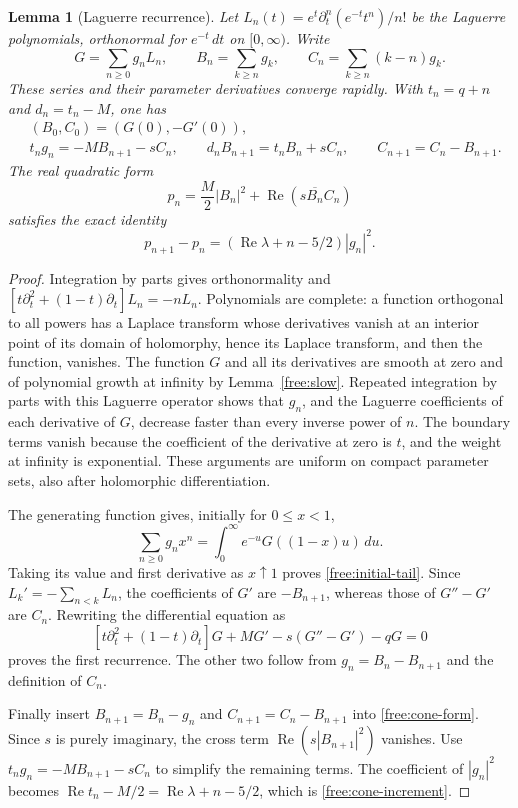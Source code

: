 \documentclass[11pt]{article}
\numberwithin{equation}{section}
\newtheorem{lemma}[theorem]{Lemma}
\theoremstyle{definition}
\theoremstyle{remark}
\begin{document}
\begin{lemma}[Laguerre recurrence]\label{free:laguerre}
Let $L_n(t)=e^t\partial_t^n(e^{-t}t^n)/n!$ be the Laguerre polynomials,
orthonormal for $e^{-t}\,dt$ on $[0,\infty)$.  Write
\[
 G=\sum_{n\ge0}g_nL_n,\qquad
 B_n=\sum_{k\ge n}g_k,\qquad C_n=\sum_{k\ge n}(k-n)g_k.
\]
These series and their parameter derivatives converge rapidly.  With
$t_n=q+n$ and $d_n=t_n-M$, one has
\begin{align}
 &(B_0,C_0)=(G(0),-G'(0)),\label{free:initial-tail}\\
 &t_ng_n=-MB_{n+1}-sC_n,\qquad
 d_nB_{n+1}=t_nB_n+sC_n,\qquad
 C_{n+1}=C_n-B_{n+1}.\label{free:recurrence}
\end{align}
The real quadratic form
\begin{equation}\label{free:cone-form}
 p_n=\frac M2|B_n|^2+\operatorname{Re}(s\overline{B_n}C_n)
\end{equation}
satisfies the exact identity
\begin{equation}\label{free:cone-increment}
 p_{n+1}-p_n=
 (\operatorname{Re}\lambda+n-5/2)|g_n|^2.
\end{equation}
\end{lemma}

\begin{proof}
Integration by parts gives orthonormality and
$[t\partial_t^2+(1-t)\partial_t]L_n=-nL_n$.
Polynomials are complete: a function orthogonal to all powers has a
Laplace transform whose derivatives vanish at an interior point of its
domain of holomorphy, hence its Laplace transform, and then the function,
vanishes.  The function $G$ and all its derivatives are smooth at zero
and of polynomial growth at infinity by Lemma~\ref{free:slow}.
Repeated integration by parts with this Laguerre operator shows that
$g_n$, and the Laguerre coefficients of each derivative of $G$, decrease
faster than every inverse power of $n$.  The boundary terms vanish
because the coefficient of the derivative at zero is $t$, and the
weight at infinity is exponential.  These arguments are uniform on
compact parameter sets, also after holomorphic differentiation.

The generating function gives, initially for $0\le x<1$,
\[
 \sum_{n\ge0}g_nx^n=
 \int_0^\infty e^{-u}G((1-x)u)\,du.
\]
Taking its value and first derivative as $x\uparrow1$ proves
\eqref{free:initial-tail}.  Since
$L_k'=-\sum_{n<k}L_n$, the coefficients of $G'$ are $-B_{n+1}$,
whereas those of $G''-G'$ are $C_n$.  Rewriting the differential equation
as
\[
 [t\partial_t^2+(1-t)\partial_t]G+MG'-s(G''-G')-qG=0
\]
proves the first recurrence.  The other two follow from
$g_n=B_n-B_{n+1}$ and the definition of $C_n$.

Finally insert $B_{n+1}=B_n-g_n$ and
$C_{n+1}=C_n-B_{n+1}$ into \eqref{free:cone-form}.  Since $s$ is purely
imaginary, the cross term $\operatorname{Re}(s|B_{n+1}|^2)$ vanishes.
Use $t_ng_n=-MB_{n+1}-sC_n$ to simplify the remaining terms.  The
coefficient of $|g_n|^2$ becomes
$\operatorname{Re}t_n-M/2=\operatorname{Re}\lambda+n-5/2$, which is
\eqref{free:cone-increment}.
\end{proof}
\end{document}
